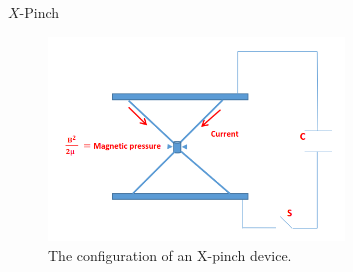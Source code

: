 \begin{frame} {$X$-Pinch}
    \begin{figure}
        \centering
        \includegraphics[width=0.7\textwidth]{figures/x-pinch.png}
        \caption{The configuration of an X-pinch device. \cite{behbahani_2017_enhancement}}
        \label{fig:x-pinch}
    \end{figure}
\end{frame}